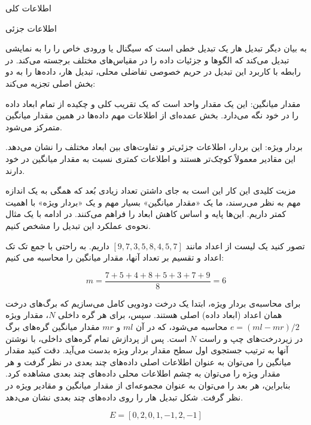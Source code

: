 
 اطلاعات کلی

 اطلاعات جزئی


به بیان دیگر تبدیل هار یک تبدیل خطی است که سیگنال یا ورودی خاص را را به نمایشی تبدیل می‌کند که الگوها و جزئیات داده را در مقیاس‌های مختلف برجسته می‌کند. در رابطه با کاربرد این تبدیل در حریم خصوصی تفاضلی محلی، تبدیل هار، داده‌ها را به دو بخش اصلی تجزیه می‌کند:


 مقدار میانگین: این یک مقدار واحد است که یک تقریب کلی و چکیده از تمام ابعاد داده را در خود نگه می‌دارد. بخش عمده‌ای از اطلاعات مهم داده‌ها در همین مقدار میانگین متمرکز می‌شود.

 بردار ویژه: این بردار، اطلاعات جزئی‌تر و تفاوت‌های بین ابعاد مختلف را نشان می‌دهد. این مقادیر معمولاً کوچک‌تر هستند و اطلاعات کمتری نسبت به مقدار میانگین در خود دارند.


مزیت کلیدی این کار این است به جای داشتن تعداد زیادی بُعد که همگی به یک اندازه مهم به نظر می‌رسند، ما یک «مقدار میانگین» بسیار مهم و یک «بردار ویژه» با اهمیت کمتر داریم. این‌ها پایه و اساس کاهش ابعاد را فراهم می‌کنند. در ادامه با یک مثال نحوه‌ی عملکرد این تبدیل را مشخص کنیم.

تصور کنید یک لیست از اعداد مانند $[9, 7, 3, 5, 8, 4, 5, 7]$ داریم. به راحتی با جمع تک تک اعداد و تقسیم بر تعداد آنها، مقدار میانگین را محاسبه می کنیم:

$$m = \frac{7+5+4+8+5+3+7+9}{8} = 6$$

برای محاسبه‌ی بردار ویژه، ابتدا یک درخت دودویی کامل می‌سازیم که برگ‌های درخت همان اعداد (ابعاد داده) اصلی هستند. سپس، برای هر گره داخلی $N$، مقدار ویژه $e = (ml {-} mr)/2$ محاسبه می‌شود، که در آن $ml$ و $mr$ مقدار میانگین گره‌های برگ در زیردرخت‌های چپ و راست $N$ است. پس از پردازش تمام گره‌های داخلی، با نوشتن آنها به ترتیب جستجوی اول سطح مقدار بردار ویژه بدست می‌آید. دقت کنید مقدار میانگین را می‌توان به عنوان اطلاعات اصلی داده‌های چند بعدی در نظر گرفت و هر مقدار ویژه را می‌توان به چشم اطلاعات محلی داده‌های چند بعدی مشاهده کرد. بنابراین، هر بعد را می‌توان به عنوان مجموعه‌ای از مقدار میانگین و مقادیر ویژه در نظر گرفت. شکل  تبدیل هار را روی داده‌های چند بعدی نشان می‌دهد.

$$E = [0, 2, 0, 1, -1, 2, -1]$$

